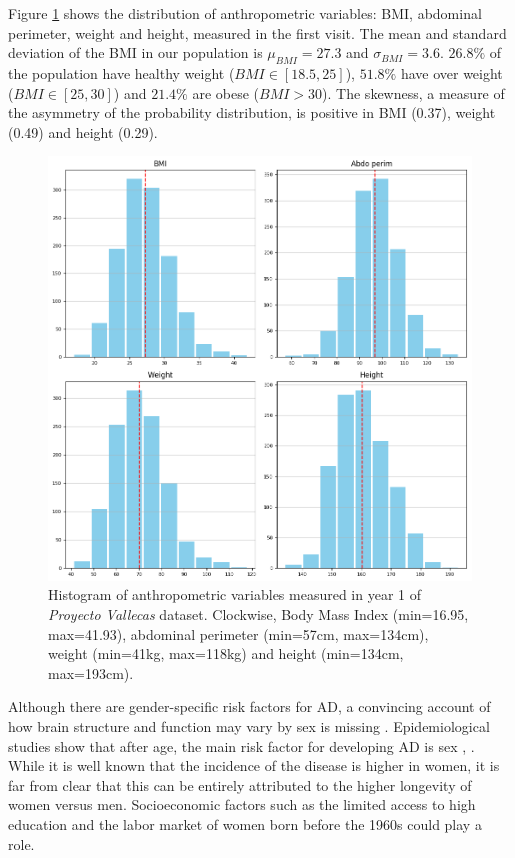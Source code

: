 \documentclass[11pt]{article}
\theoremstyle{definition}
\theoremstyle{remark}
\begin{document}
Figure \ref{fig:anthro} shows the distribution of anthropometric variables: BMI, abdominal perimeter, weight and height, measured in the first visit. 
The mean and standard deviation of the BMI in our population is $\mu_{BMI}=27.3$ and $\sigma_{BMI}=3.6$. $26.8\%$ of the population have healthy weight ($BMI \in [18.5, 25]$), $51.8\%$ have over weight ($BMI \in [25,30]$) and $21.4\%$ are obese ($BMI > 30$). The skewness, a measure of the asymmetry of the probability distribution, is positive in BMI (0.37), weight (0.49) and height (0.29).


\begin{figure}[H]
        \centering
        \includegraphics[keepaspectratio, width=.8\linewidth]{figures/Fig_anthro}
        \caption{Histogram of anthropometric variables measured in year 1 of \emph{Proyecto Vallecas} dataset. Clockwise, Body Mass Index (min=16.95, max=41.93), abdominal perimeter (min=57cm, max=134cm), weight (min=41kg, max=118kg) and height (min=134cm, max=193cm). 
        } 
        \label{fig:anthro}
\end{figure}

Although there are gender-specific risk factors for AD, a convincing account of how brain structure and function  may vary by sex is missing \cite{mielke2014clinical}. Epidemiological studies show that after age, the main risk factor for developing AD  is sex \cite{vina2010women}, \cite{mazure2016sex}. While it is well known that the incidence of the disease is higher in women, it is far from clear that this can be entirely attributed to the higher longevity of women versus men. Socioeconomic factors such as the limited access to high education and the labor market of women born before the 1960s could play a role. 
\end{document}
